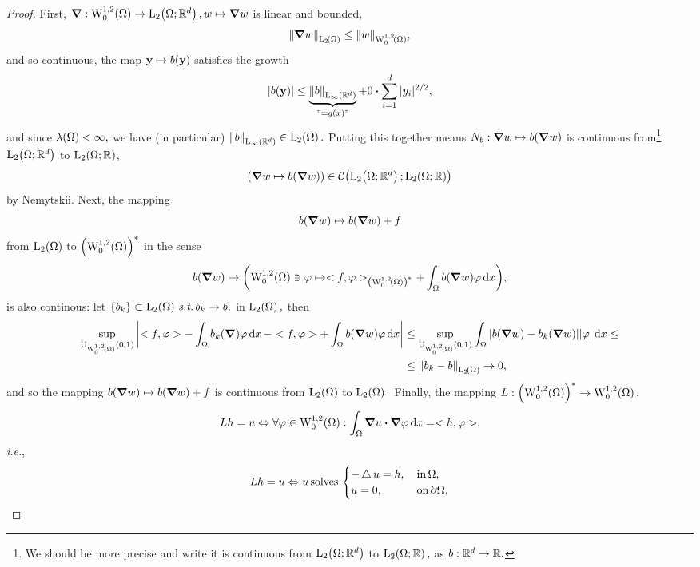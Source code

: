 \documentclass{article}
\begin{document}
\begin{example}
\begin{proof}
	First, $\grad: \WkpzeroSet[1][2]{\Omega} \to \LpSet[2]{\Omega;\R^{d}}, w \mapsto \grad w$ is linear and bounded,
	\[
		\norm{\grad w}_{\LpSet[2]{\Omega}} \leq \norm{w}_{\WkpzeroSet[1][2]{\Omega}},
	\]
	and so continuous, the map $\vb{y} \mapsto b\qty(\vb{y})$ satisfies the growth
		\[
			\abs{b\qty(\vb{y})} \leq \underbrace{\norm{b}_{\LinfSet{\R^{d}}}}_{" = g(x)"} + 0 \vdot \sum_{i=1}^d |y_i|^{2/2},
		\]
		and since $\lambda\qty(\Omega) < \infty,$ we have (in particular) $\norm{b}_{\LinfSet{\R^{d}}} \in \LpSet[2]{\Omega}.$ Putting this together means $N_b: \grad w \mapsto b\qty(\grad w)$ is continuous from\footnote{We should be more precise and write it is continuous from $\LpSet[2]{\Omega; \R^{d}}$ to $\LpSet[2]{\Omega;\R},$ as $b: {\mathbb R}^{d} \to {\mathbb R}.$} $\LpSet[2]{\Omega; \R^{d}}$ to $\LpSet[2]{\Omega;\R}$,
		\[
			\qty(\grad w \mapsto b\qty(\grad w)) \in \mathcal{C}\qty(\LpSet[2]{\Omega; \R^{d}}; \LpSet[2]{\Omega; \R})
		\]
		by Nemytskii. Next, the mapping
		\[
			b\qty(\grad w) \mapsto b\qty(\grad w) + f
		\]
		from $\LpSet[2]{\Omega}$ to $\qty(\WkpzeroSet[1][2]{\Omega})^{*}$ in the sense
		\[
			b\qty(\grad w) \mapsto \qty(\WkpzeroSet[1][2]{\Omega} \ni \varphi \mapsto <f, \varphi>_{\qty(\WkpzeroSet[1][2]{\Omega})^{*}}+ \int_{\Omega}b\qty(\grad w)\varphi\dd{x}),
		\]
		is also continous: let $\qty{b_k}\subset \LpSet[2]{\Omega} \, \text{\textit{s.t.}} \, b_k \to b,$ in $\LpSet[2]{\Omega},$ then
		\begin{align*}
			\sup_{\text{U}_{\WkpzeroSet[1][2]{\Omega}}(0,1)}\abs{<f, \varphi> -\int_{\Omega}b_k\qty(\grad )\varphi \dd{x} - <f, \varphi> + \int_{\Omega}b\qty(\grad w)\varphi\dd{x}} &\leq \sup_{\text{U}_{\WkpzeroSet[1][2]{\Omega}}(0,1)}\int_{\Omega}\abs{b\qty(\grad w)- b_k\qty(\grad w)}\abs{\varphi}\dd{x} \leq \\
																								 &\leq \norm{b_k - b}_{\LpSet[2]{\Omega}} \to 0,
		\end{align*}
		and so the mapping $b\qty(\grad w) \mapsto b\qty(\grad w) + f$ is continuous from $\LpSet[2]{\Omega}$ to $\LpSet[2]{\Omega}.$ Finally, the mapping $L: \qty(\WkpzeroSet[1][2]{\Omega})^{*} \to \WkpzeroSet[1][2]{\Omega},$
		\[
			Lh = u \Leftrightarrow \forall \varphi \in \WkpzeroSet[1][2]{\Omega}: \int_{\Omega}\grad u \vdot \grad \varphi\dd{x} = <h, \varphi>,
		\]
		\textit{i.e.},
		\[
			Lh = u \Leftrightarrow u \, \text{solves} \, \begin{cases}
				- \operatorname{\bigtriangleup} u = h, & \, \text{in} \, \Omega, \\
				u = 0, & \, \text{on} \, \partial \Omega,
			\end{cases}
\]
\end{proof}
\end{example}
\end{document}
